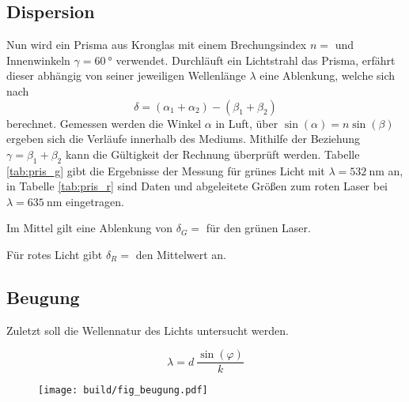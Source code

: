 \subsection{Dispersion}

Nun wird ein Prisma aus Kronglas mit einem Brechungsindex $n = $ und Innenwinkeln $\gamma = \qty{60}{\degree}$ \cite{reflex}
verwendet. Durchläuft ein Lichtstrahl das Prisma, erfährt dieser abhängig von seiner jeweiligen Wellenlänge $\lambda$ eine Ablenkung, welche sich nach
\begin{equation*}
	\delta = (\alpha_1 + \alpha_2) - (\beta_1 + \beta_2)
\end{equation*}
berechnet. Gemessen werden die Winkel $\alpha$ in Luft, über $\sin(\alpha) = n \sin(\beta)$ ergeben sich die Verläufe innerhalb des Mediums.
Mithilfe der Beziehung $\gamma = \beta_1 + \beta_2$ kann die Gültigkeit der Rechnung überprüft werden. Tabelle \ref{tab:pris_g} gibt die
Ergebnisse der Messung für grünes Licht mit $\lambda = \qty{532}{\nano\meter}$ an, in Tabelle \ref{tab:pris_r} sind Daten und abgeleitete Größen
zum roten Laser bei $\lambda = \qty{635}{\nano\meter}$ eingetragen.

\begin{table}[H]
	\centering
	\caption{}
	
	\label{tab:pris_g}
\end{table}

Im Mittel gilt eine Ablenkung von $\delta_G = $ für den grünen Laser.

\begin{table}[H]
	\centering
	\caption{}
	
	\label{tab:pris_r}
\end{table}

Für rotes Licht gibt $\delta_R = $ den Mittelwert an.


\subsection{Beugung}

Zuletzt soll die Wellennatur des Lichts untersucht werden.

\begin{equation*}
	\lambda = d \: \frac{\sin(\varphi)}{k}
\end{equation*}

\begin{figure}[H]
	\texttt{[image: build/fig\_beugung.pdf]}
	\caption{}
	\label{fig:beugung}
\end{figure}

